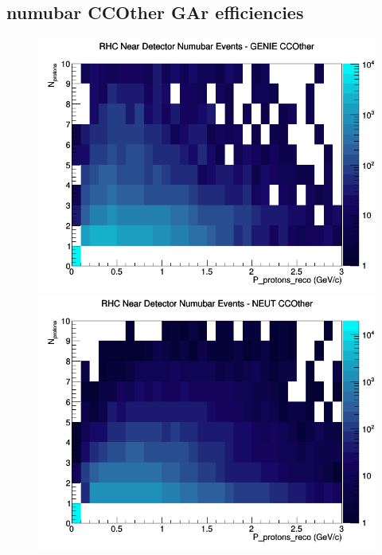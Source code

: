 \documentclass[12pt]{article}
\begin{document}
\subsection{numubar CCOther GAr efficiencies}
\begin{figure}[h]
\includegraphics[width=\linewidth]{eff_N_P/GAr/protons/CCOther_RHC_ND_numubar_N_P_GENIE.png}
\endminipage
{}
\includegraphics[width=\linewidth]{eff_N_P/GAr/protons/CCOther_RHC_ND_numubar_N_P_NEUT.png}
\endminipage
{}

\end{figure}
\end{document}
